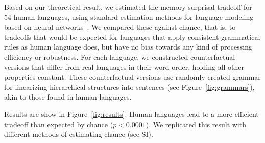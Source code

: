 \documentclass[11pt,letterpaper]{article}
\newcounter{theorem}
\begin{document}





%
%




Based on our theoretical result, we estimated the memory-surprisal tradeoff for 54 human languages, using standard estimation methods for language modeling based on neural networks~\citep{hochreiter-long-1997}.
We compared these against chance, that is, to tradeoffs that would be expected for languages that apply consistent grammatical rules as human language does, but have no bias towards any kind of processing efficiency or robustness.
For each language, we constructed counterfactual versions that differ from real languages in their word order, holding all other properties constant.
These counterfactual versions use randomly created grammar for linearizing hierarchical structures into sentences (see Figure~\ref{fig:grammars}), akin to those found in human languages.


%


Results are show in Figure~\ref{fig:results}.
Human languages lead to a more efficient tradeoff than expected by chance ($p < 0.0001$).
We replicated this result with different methods of estimating chance (see SI).
\end{document}
